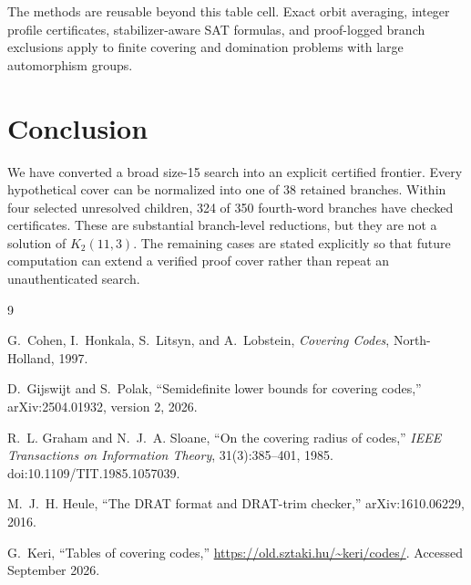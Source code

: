 \documentclass[11pt]{article}
\theoremstyle{definition}
\theoremstyle{remark}
\begin{document}
The methods are reusable beyond this table cell.  Exact orbit averaging,
integer profile certificates, stabilizer-aware SAT formulas, and
proof-logged branch exclusions apply to finite covering and domination
problems with large automorphism groups.

\section{Conclusion}

We have converted a broad size-15 search into an explicit certified
frontier.  Every hypothetical cover can be normalized into one of 38
retained branches.  Within four selected unresolved children, 324 of 350
fourth-word branches have checked certificates.  These are substantial
branch-level reductions, but they are not a solution of $K_2(11,3)$.
The remaining cases are stated explicitly so that future computation
can extend a verified proof cover rather than repeat an unauthenticated
search.

\begin{thebibliography}{9}

G.~Cohen, I.~Honkala, S.~Litsyn, and A.~Lobstein,
\emph{Covering Codes},
North-Holland, 1997.

D.~Gijswijt and S.~Polak,
``Semidefinite lower bounds for covering codes,''
arXiv:2504.01932, version 2, 2026.

R.~L. Graham and N.~J.~A. Sloane,
``On the covering radius of codes,''
\emph{IEEE Transactions on Information Theory},
31(3):385--401, 1985.
doi:10.1109/TIT.1985.1057039.

M.~J.~H. Heule,
``The DRAT format and DRAT-trim checker,''
arXiv:1610.06229, 2016.

G.~Keri,
``Tables of covering codes,''
\url{https://old.sztaki.hu/~keri/codes/}.
Accessed September 2026.

\end{thebibliography}
\end{document}
